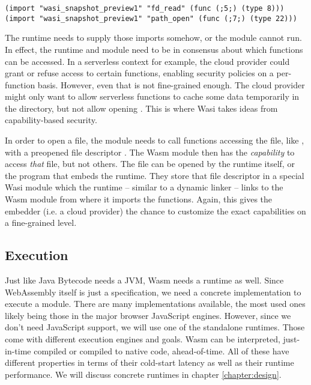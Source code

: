 \begin{verbatim}
(import "wasi_snapshot_preview1" "fd_read" (func (;5;) (type 8)))
(import "wasi_snapshot_preview1" "path_open" (func (;7;) (type 22)))
\end{verbatim}

The runtime needs to supply those imports somehow, or the module cannot run. In effect, the runtime and module need to be in consensus about which functions can be accessed. In a serverless context for example, the cloud provider could grant or refuse access to certain functions, enabling security policies on a per-function basis. However, even that is not fine-grained enough. The cloud provider might only want to allow serverless functions to cache some data temporarily in the  directory, but not allow opening . This is where Wasi takes ideas from capability-based security.

In order to open a file, the module needs to call functions accessing the file, like , with a preopened file descriptor \cite{Clark2019}. The Wasm module then has the \emph{capability} to access \emph{that} file, but not others. The file can be opened by the runtime itself, or the program that embeds the runtime. They store that file descriptor in a special Wasi module which the runtime -- similar to a dynamic linker -- links to the Wasm module from where it imports the functions. Again, this gives the embedder (i.e. a cloud provider) the chance to customize the exact capabilities on a fine-grained level.


\subsection{Execution}

Just like Java Bytecode needs a JVM, Wasm needs a runtime as well. Since WebAssembly itself is just a specification, we need a concrete implementation to execute a module. There are many implementations available, the most used ones likely being those in the major browser JavaScript engines. However, since we don't need JavaScript support, we will use one of the standalone runtimes. Those come with different execution engines and goals. Wasm can be interpreted, just-in-time compiled or compiled to native code, ahead-of-time. All of these have different properties in terms of their cold-start latency as well as their runtime performance. We will discuss concrete runtimes in chapter \ref{chapter:design}.
